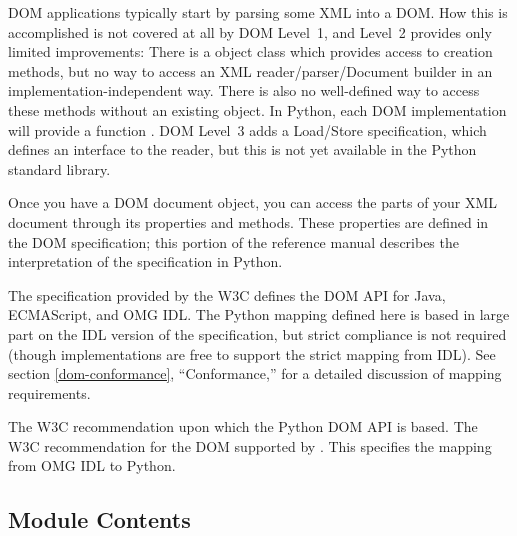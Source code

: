DOM applications typically start by parsing some XML into a DOM.  How
this is accomplished is not covered at all by DOM Level~1, and Level~2
provides only limited improvements: There is a
 object class which provides access to
 creation methods, but no way to access an XML
reader/parser/Document builder in an implementation-independent way.
There is also no well-defined way to access these methods without an
existing  object.  In Python, each DOM implementation
will provide a function . DOM Level~3
adds a Load/Store specification, which defines an interface to the
reader, but this is not yet available in the Python standard library.

Once you have a DOM document object, you can access the parts of your
XML document through its properties and methods.  These properties are
defined in the DOM specification; this portion of the reference manual
describes the interpretation of the specification in Python.

The specification provided by the W3C defines the DOM API for Java,
ECMAScript, and OMG IDL.  The Python mapping defined here is based in
large part on the IDL version of the specification, but strict
compliance is not required (though implementations are free to support
the strict mapping from IDL).  See section \ref{dom-conformance},
``Conformance,'' for a detailed discussion of mapping requirements.


\begin{seealso}
           {The W3C recommendation upon which the Python DOM API is
            based.}
           {The W3C recommendation for the
            DOM supported by .}
           {This specifies the mapping from OMG IDL to Python.}
\end{seealso}

\subsection{Module Contents}

